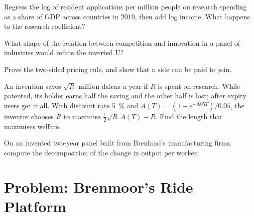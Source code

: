 \begin{exercise}[$\star\star$]\label{exo:b3:platforms-and-innovation:8}
Regress the log of resident  applications per million people on research
spending as a share of GDP across countries in 2019, then add log income. What happens to
the research coefficient?
\end{exercise}

\begin{exercise}[$\star\star$]\label{exo:b3:platforms-and-innovation:9}
What shape of the relation between competition and innovation in a panel of
industries would refute the inverted U?
\end{exercise}

\begin{exercise}[$\star\star\star$]\label{exo:b3:platforms-and-innovation:10}
Prove the two-sided pricing rule, and show that a side can be paid to join.
\end{exercise}

\begin{exercise}[$\star\star\star$]\label{exo:b3:platforms-and-innovation:11}
An invention saves $\sqrt R$ million dalens a year if $R$ is spent on research. While patented, its holder
earns half the saving and the other half is lost; after expiry users get it all. With
discount rate 5~\% and $A(T) = (1 - e^{-0.05T})/0.05$, the inventor chooses $R$ to maximise $\tfrac12\sqrt R\,A(T) - R$. Find the
 length that maximises welfare.
\end{exercise}

\begin{exercise}[$\star\star\star$]\label{exo:b3:platforms-and-innovation:12}
On an invented two-year panel built from Brenland's manufacturing firms, compute the
decomposition of the change in output per worker.
\end{exercise}

\section{Problem: Brenmoor's Ride Platform}\label{sec:b3:platforms-and-innovation:problem}

